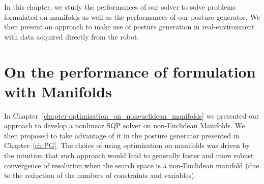 



In this chapter, we study the performances of our solver to solve problems formulated on manifolds as well as the performances of our posture generator.
We then present an approach to make use of posture generation in real-environment with data acquired directly from the robot.

\section{On the performance of formulation with Manifolds}
\label{sec:On_the_performance_of_formulation_with_manifolds}

In Chapter~\ref{chapter:optimization_on_noneuclidean_manifolds} we presented our approach to develop a nonlinear SQP solver on non-Euclidean Manifolds.
We then proposed to take advantage of it in the posture generator presented in Chapter~\ref{ch:PG}.
The choice of using optimization on manifolds was driven by the intuition that such approach would lead to generally faster and more robust convergence of resolution when the search space is a non-Euclidean manifold (due to the reduction of the numbers of constraints and variables).

